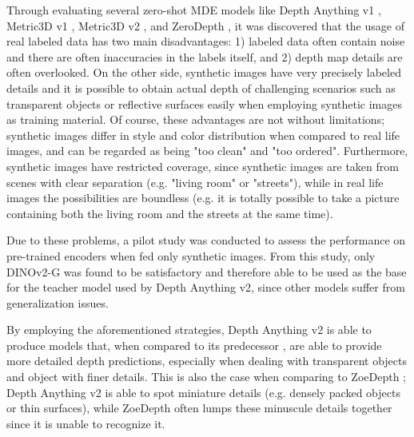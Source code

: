 Through evaluating several zero-shot MDE models like Depth Anything v1 \parencite{DepthAnythingV1}, Metric3D v1 \parencite{metric3Dv1}, Metric3D v2 \parencite{metric3Dv2}, and ZeroDepth \parencite{zerodepth}, it was discovered that the usage of real labeled data has two main disadvantages: 1) labeled data often contain noise and there are often inaccuracies in the labels itself, and 2) depth map details are often overlooked. On the other side, synthetic images have very precisely labeled details and it is possible to obtain actual depth of challenging scenarios such as transparent objects or reflective surfaces easily when employing synthetic images as training material. Of course, these advantages are not without limitations; synthetic images differ in style and color distribution when compared to real life images, and can be regarded as being "too clean" and "too ordered". Furthermore, synthetic images have restricted coverage, since synthetic images are taken from scenes with clear separation (e.g. "living room" or "streets"), while in real life images the possibilities are boundless (e.g. it is totally possible to take a picture containing both the living room and the streets at the same time).

Due to these problems, a pilot study was conducted to assess the performance on pre-trained encoders when fed only synthetic images. From this study, only DINOv2-G \parencite{dinov2} was found to be satisfactory and therefore able to be used as the base for the teacher model used by Depth Anything v2, since other models suffer from generalization issues.

By employing the aforementioned strategies, Depth Anything v2 is able to produce models that, when compared to its predecessor \parencite{DepthAnythingV1}, are able to provide more detailed depth predictions, especially when dealing with transparent objects and object with finer details. This is also the case when comparing to ZoeDepth \parencite{ZoeDepth}; Depth Anything v2 is able to spot miniature details (e.g. densely packed objects or thin surfaces), while ZoeDepth often lumps these minuscule details together since it is unable to recognize it.


